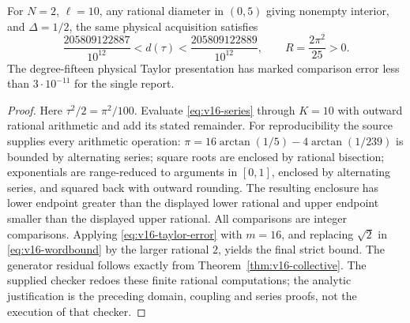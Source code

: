 \begin{corollary}
\label{cor:v16-numerical}
For $N=2$, $\ell=10$, any rational diameter in $(0,5)$ giving nonempty
interior, and $\Delta=1/2$, the same physical acquisition satisfies
\[
 \frac{205809122887}{10^{12}}<d(\tau)
            <\frac{205809122889}{10^{12}},\qquad
 R=\frac{2\pi^2}{25}>0.
\]
The degree-fifteen physical Taylor presentation has marked comparison
error less than $3\cdot10^{-11}$ for the single report.
\end{corollary}
\begin{proof}
Here $\tau^2/2=\pi^2/100$. Evaluate \eqref{eq:v16-series} through
$K=10$ with outward rational arithmetic and add its stated remainder.
For reproducibility the source supplies every arithmetic operation:
$\pi=16\arctan(1/5)-4\arctan(1/239)$ is bounded by alternating series;
square roots are enclosed by rational bisection; exponentials are
range-reduced to arguments in $[0,1]$, enclosed by alternating series,
and squared back with outward rounding. The resulting enclosure has
lower endpoint greater than the displayed lower rational and upper
endpoint smaller than the displayed upper rational. All comparisons
are integer comparisons. Applying \eqref{eq:v16-taylor-error} with
$m=16$, and replacing $\sqrt2$ in \eqref{eq:v16-wordbound} by the
larger rational $2$, yields the final strict bound. The generator
residual follows exactly from Theorem~\ref{thm:v16-collective}.
The supplied checker redoes these finite rational computations; the
analytic justification is the preceding domain, coupling and series
proofs, not the execution of that checker.
\end{proof}
